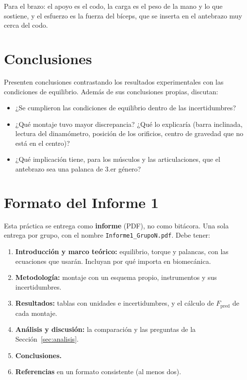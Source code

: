 \documentclass[11pt, letterpaper]{article}
\begin{document}
	\noindent
	Para el brazo: el apoyo es el codo, la carga es el peso de la mano y lo que
	sostiene, y el esfuerzo es la fuerza del bíceps, que se inserta en el
	antebrazo muy cerca del codo.
	
	\section{Conclusiones}
	
	Presenten conclusiones contrastando los resultados experimentales con las
	condiciones de equilibrio. Además de sus conclusiones propias, discutan:
	
	\begin{itemize}
		\item ¿Se cumplieron las condiciones de equilibrio dentro de las
		incertidumbres?
		\item ¿Qué montaje tuvo mayor discrepancia? ¿Qué lo explicaría (barra
		inclinada, lectura del dinamómetro, posición de los orificios, centro
		de gravedad que no está en el centro)?
		\item ¿Qué implicación tiene, para los músculos y las articulaciones, que
		el antebrazo sea una palanca de 3.er género?
	\end{itemize}
	
	\section{Formato del Informe 1}\label{sec:informe}
	
	Esta práctica se entrega como \textbf{informe} (PDF), no como bitácora.
	Una sola entrega por grupo, con el nombre
	\texttt{Informe1\_GrupoN.pdf}. Debe tener:
	
	\begin{enumerate}
		\item \textbf{Introducción y marco teórico:} equilibrio, torque y
		palancas, con las ecuaciones que usarán. Incluyan por qué importa en
		biomecánica.
		\item \textbf{Metodología:} montaje con un esquema propio, instrumentos y
		sus incertidumbres.
		\item \textbf{Resultados:} tablas con unidades e incertidumbres, y el
		cálculo de $F_{\text{pred}}$ de cada montaje.
		\item \textbf{Análisis y discusión:} la comparación y las preguntas de la
		Sección~\ref{sec:analisis}.
		\item \textbf{Conclusiones.}
		\item \textbf{Referencias} en un formato consistente (al menos dos).
	\end{enumerate}
	
\end{document}
